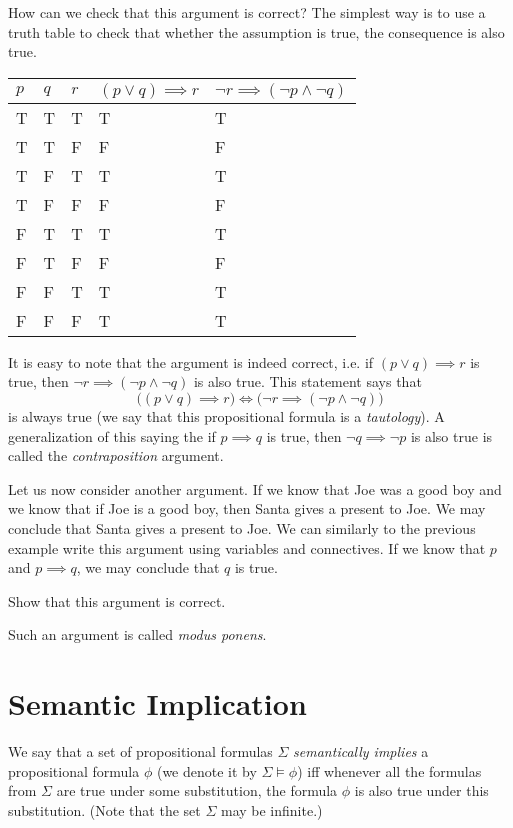 How can we check that this argument is correct? The simplest way is to use a
truth table to check that whether the assumption is true, the consequence is
also true.
\begin{center}
    \begin{tabular}{l l l l l}
        \toprule
        $p$ & $q$ & $r$ & $(p \lor q) \implies r$ &
        $\lnot r \implies (\lnot p \land \lnot q)$ \\
        \midrule
        T & T & T & T & T \\
        T & T & F & F & F \\
        T & F & T & T & T \\
        T & F & F & F & F \\
        F & T & T & T & T \\
        F & T & F & F & F \\
        F & F & T & T & T \\
        F & F & F & T & T \\
        \bottomrule
    \end{tabular}
\end{center}
It is easy to note that the argument is indeed correct, i.e.
if $(p \lor q) \implies r$ is true, then
$\lnot r \implies (\lnot p \land \lnot q)$ is also true.
This statement says that
\[
  \bigl((p \lor q) \implies r\bigr) \iff
  \bigl(\lnot r \implies (\lnot p \land \lnot q) \bigr)
\]
is always true (we say that this propositional formula is a
\emph{tautology}). A generalization of this saying the if $p \implies q$ is
true, then $\lnot q \implies \lnot p$ is also true is called the
\emph{contraposition} argument.

Let us now consider another argument. If we know that Joe was a good boy and we
know that if Joe is a good boy, then Santa gives a present to Joe. We may
conclude that Santa gives a present to Joe. We can similarly to the previous
example write this argument using variables and connectives.
If we know that $p$ and $p \implies q$, we may conclude that $q$ is true.
\begin{exercise}
  Show that this argument is correct.
\end{exercise}
Such an argument is called \emph{modus ponens}.

\section{Semantic Implication}
We say that a set of propositional formulas $\Sigma$ \emph{semantically implies}
a propositional formula $\phi$ (we denote it by $\Sigma \models \phi$)
iff whenever all the formulas from $\Sigma$ are true under some substitution,
the formula $\phi$ is also true under this substitution.
(Note that the set $\Sigma$ may be infinite.)

